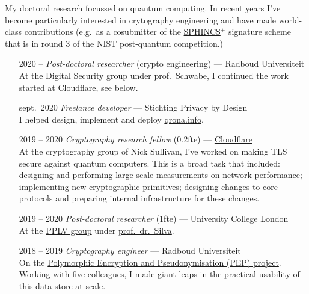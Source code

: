 \documentclass{article}
\newcommand\partitle[1]{\vskip20pt\par\noindent{\textsf{\textbf{#1}}}}
\begin{document}
My doctoral research focussed on quantum computing.
In recent years I've become particularly interested
    in crytography engineering and have made world-class contributions
        (e.g.~as a cosubmitter of the
	\href{https://sphincs.org/data/sphincs+-round3-specification.pdf}{SPHINCS$^+$}
    signature scheme that is in round 3 of the NIST post-quantum competition.)

\partitle{Career}
\begin{itemize}
    \item[2020 --] \emph{Post-doctoral researcher} (crypto engineering) --- Radboud Universiteit\\
        At the Digital Security group under prof.~Schwabe,
            I continued the work started at Cloudflare, see below.
    \item[sept.~2020] \emph{Freelance developer} --- Stichting Privacy by Design\\
        I helped design, implement and deploy \href{https://qrona.info}{qrona.info}.
    \item[2019 -- 2020] \emph{Cryptography research fellow} (0.2fte) --- 
        \href{https://cloudflare.com}{Cloudflare} \\
        At the cryptography group of Nick Sullivan, I've
            worked on making TLS secure against quantum computers.
        This is a broad task that included:
                designing and performing large-scale measurements on network
                    performance;
                implementing new cryptographic primitives;
                designing changes to core protocols and
                    preparing internal infrastructure for these changes.
    \item[2019 -- 2020] \emph{Post-doctoral researcher} (1fte) --- University
        College London\\
        At the \href{http://pplv.cs.ucl.ac.uk/welcome/}{PPLV group}
            under \href{https://alexandrasilva.org/#/main.html}{prof.~dr.~Silva}.
    \item[2018 -- 2019] \emph{Cryptography engineer} --- Radboud Universiteit\\
        On the \href{https://pep.cs.ru.nl}{Polymorphic Encryption and Pseudonymisation (PEP) project}.
        Working with five colleagues, I made giant leaps in the practical usability
        of this data store at scale.


\end{itemize}
\end{document}
